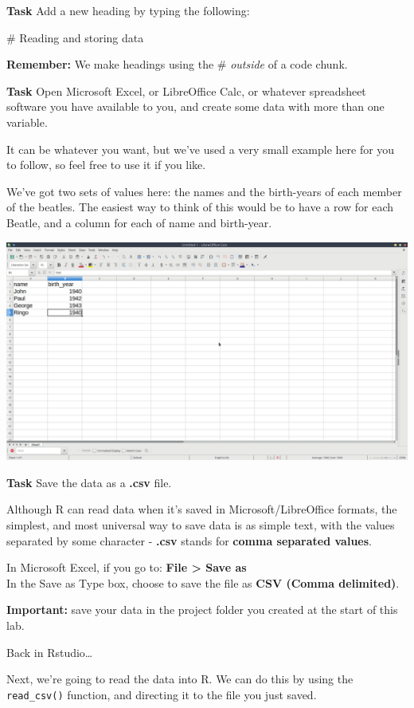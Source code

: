\documentclass[]{book}
\begin{document}
\textbf{Task}
Add a new heading by typing the following:

\# Reading and storing data

\textbf{Remember:} We make headings using the \# \emph{outside} of a code chunk.

\textbf{Task}
Open Microsoft Excel, or LibreOffice Calc, or whatever spreadsheet software you have available to you, and create some data with more than one variable.

It can be whatever you want, but we've used a very small example here for you to follow, so feel free to use it if you like.

We've got two sets of values here: the names and the birth-years of each member of the beatles. The easiest way to think of this would be to have a row for each Beatle, and a column for each of name and birth-year.

\includegraphics{images/installing_intro/create_data.png}

\textbf{Task}
Save the data as a \textbf{.csv} file.

Although R can read data when it's saved in Microsoft/LibreOffice formats, the simplest, and most universal way to save data is as simple text, with the values separated by some character - \textbf{.csv} stands for \textbf{comma separated values}.

In Microsoft Excel, if you go to:
\textbf{File \textgreater{} Save as}\\
In the Save as Type box, choose to save the file as \textbf{CSV (Comma delimited)}.

\textbf{Important:} save your data in the project folder you created at the start of this lab.

Back in Rstudio\ldots{}

Next, we're going to read the data into R. We can do this by using the \texttt{read\_csv()} function, and directing it to the file you just saved.
\end{document}
